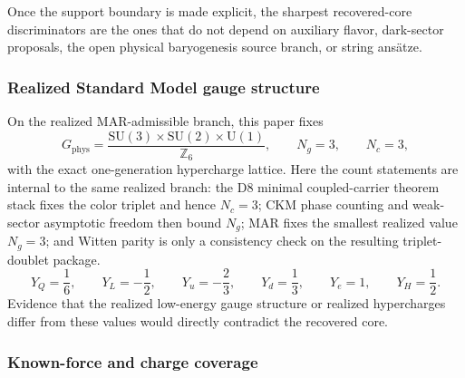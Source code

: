 \documentclass[11pt]{article}
\newcommand{\SU}{\mathrm{SU}}
\newcommand{\U}{\mathrm{U}}
\begin{document}
Once the support boundary is made explicit, the sharpest recovered-core discriminators are the ones that do not depend on auxiliary flavor, dark-sector proposals, the open physical baryogenesis source branch, or string ans\"atze.

\subsubsection{Realized Standard Model gauge structure}

On the realized MAR-admissible branch, this paper fixes
\[
G_{\mathrm{phys}}=
\frac{\SU(3)\times\SU(2)\times\U(1)}{\mathbb Z_6},
\qquad
N_g=3,
\qquad
N_c=3,
\]
with the exact one-generation hypercharge lattice. Here the count statements are internal to the same realized branch: the D8 minimal coupled-carrier theorem stack fixes the color triplet and hence \(N_c=3\); CKM phase counting and weak-sector asymptotic freedom then bound \(N_g\); MAR fixes the smallest realized value \(N_g=3\); and Witten parity is only a consistency check on the resulting triplet-doublet package.
\[
Y_Q=\frac16,\qquad
Y_L=-\frac12,\qquad
Y_u=-\frac23,\qquad
Y_d=\frac13,\qquad
Y_e=1,\qquad
Y_H=\frac12.
\]
Evidence that the realized low-energy gauge structure or realized hypercharges differ from these values would directly contradict the recovered core.

\subsubsection{Known-force and charge coverage}
\end{document}
